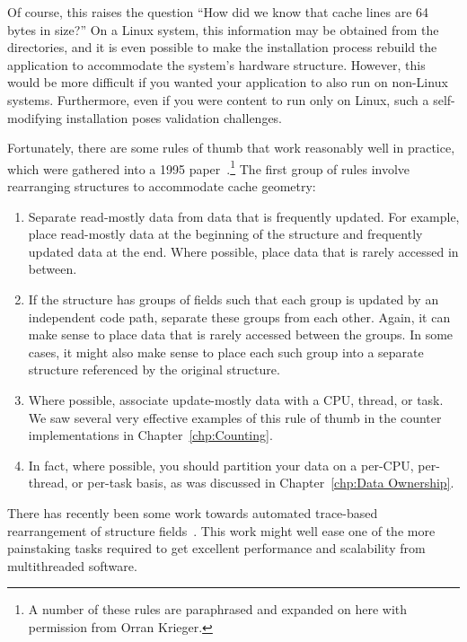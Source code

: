 Of course, this raises the question ``How did we know that cache lines
are 64 bytes in size?''
On a Linux system, this information may be obtained from the
 directories, and it is even
possible to make the installation process rebuild the application to
accommodate the system's hardware structure.
However, this would be more difficult if you wanted your application to
also run on non-Linux systems.
Furthermore, even if you were content to run only on Linux, such a
self-modifying installation poses validation challenges.

Fortunately, there are some rules of thumb that work reasonably well in
practice, which were gathered into a 1995
paper~\cite{BenjaminGamsa95a}.\footnote{
	A number of these rules are paraphrased and expanded on here
	with permission from Orran Krieger.}
The first group of rules involve rearranging structures to accommodate
cache geometry:

\begin{enumerate}
\item	Separate read-mostly data from data that is frequently updated.
	For example, place read-mostly data at the beginning of the
	structure and frequently updated data at the end.
	Where possible, place data that is rarely accessed in between.
\item	If the structure has groups of fields such that each group is
	updated by an independent code path, separate these groups
	from each other.
	Again, it can make sense to place data that is rarely accessed
	between the groups.
	In some cases, it might also make sense to place each such group
	into a separate structure referenced by the original structure.
\item	Where possible, associate update-mostly data with a CPU, thread,
	or task.
	We saw several very effective examples of this rule of thumb
	in the counter implementations in
	Chapter~\ref{chp:Counting}.
\item	In fact, where possible, you should partition your data on
	a per-CPU, per-thread, or per-task basis, as was discussed
	in Chapter~\ref{chp:Data Ownership}.
\end{enumerate}

There has recently been some work towards automated trace-based
rearrangement of structure
fields~\cite{Golovanevsky:2010:TDL:2174824.2174835}.
This work might well ease one of the more painstaking tasks
required to get excellent performance and scalability from
multithreaded software.


